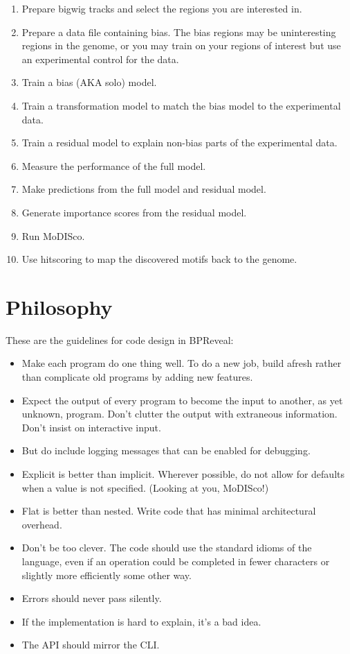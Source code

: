\documentclass{article}
\begin{document}
\begin{enumerate}
    \item Prepare bigwig tracks and select the regions you are interested in.
    \item Prepare a data file containing bias. The bias regions may be uninteresting regions in the genome, or you may train on your regions of interest but use an experimental control for the data.
    \item Train a bias (AKA solo) model.
    \item Train a transformation model to match the bias model to the experimental data.
    \item Train a residual model to explain non-bias parts of the experimental data.
    \item Measure the performance of the full model.
    \item Make predictions from the full model and residual model.
    \item Generate importance scores from the residual model.
    \item Run MoDISco.
    \item Use hitscoring to map the discovered motifs back to the genome.
\end{enumerate}

\newpage

\section{Philosophy}

These are the guidelines for code design in BPReveal:

\begin{itemize}
    \item Make each program do one thing well. To do a new job, build afresh rather than complicate old programs by adding new features.
    \item Expect the output of every program to become the input to another, as yet unknown, program. Don't clutter the output with extraneous information. Don't insist on interactive input.
    \item But do include logging messages that can be enabled for debugging.
    \item Explicit is better than implicit. Wherever possible, do not allow for defaults when a value is not specified.  (Looking at you, MoDISco!)
    \item Flat is better than nested. Write code that has minimal architectural overhead.
    \item Don't be too clever. The code should use the standard idioms of the language, even if an operation could be completed in fewer characters or slightly more efficiently some other way.
    \item Errors should never pass silently.
    \item If the implementation is hard to explain, it's a bad idea.
    \item The API should mirror the CLI.
\end{itemize}
\end{document}
